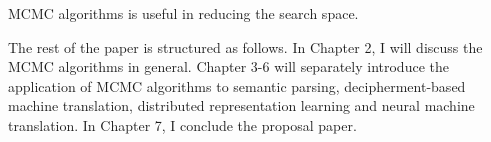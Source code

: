 MCMC algorithms is useful in reducing the search space.


The rest of the paper is structured as follows. In Chapter 2, I will discuss the MCMC algorithms in general. Chapter 3-6 will separately introduce the application of MCMC algorithms to 
semantic parsing, decipherment-based machine translation, distributed representation learning and neural machine translation. In Chapter 7, I conclude the proposal paper.
